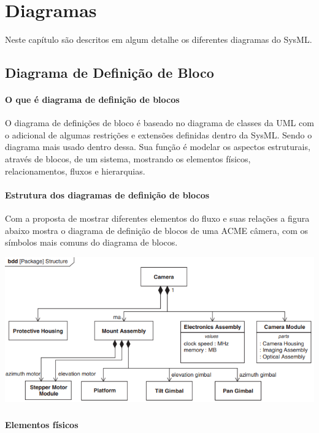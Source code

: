 \chapter{Diagramas}
\label{CAP2}

Neste capítulo são descritos em algum detalhe os diferentes diagramas do SysML. 


\section{Diagrama de Definição de Bloco}
\subsubsection{O que é diagrama de definição de blocos}

O diagrama de definições de bloco é baseado no diagrama de classes da UML com o adicional de algumas restrições e extensões definidas dentro da SysML. Sendo o diagrama mais usado dentro dessa. Sua função é modelar os aspectos estruturais, através de blocos, de um sistema, mostrando os elementos físicos, relacionamentos, fluxos e hierarquias.

\subsubsection{Estrutura dos diagramas de definição de blocos}

Com a proposta de mostrar diferentes elementos do fluxo e suas relações a figura abaixo mostra o diagrama de definição de blocos de uma ACME câmera, com os símbolos mais comuns do diagrama de blocos.

\includegraphics[width=\textwidth,height=\textheight,keepaspectratio]{figures/diagrama de blocos.PNG}

\paragraph{}
 \textbf{Elementos físicos} 
 
